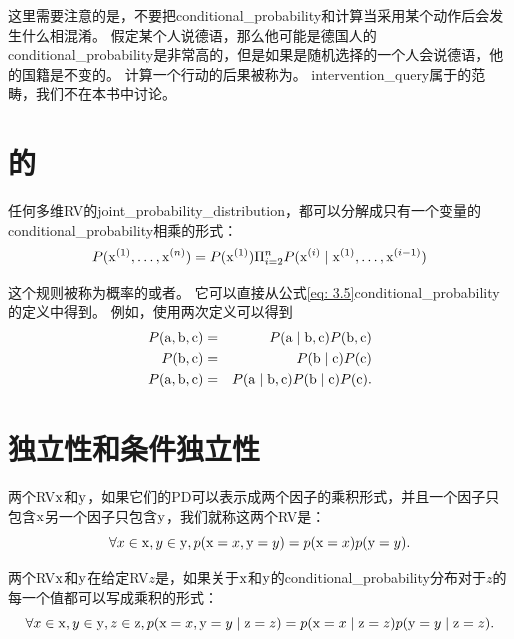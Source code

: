 这里需要注意的是，不要把\gls{conditional_probability}和计算当采用某个动作后会发生什么相混淆。
假定某个人说德语，那么他可能是德国人的\gls{conditional_probability}是非常高的，但是如果是随机选择的一个人会说德语，他的国籍是不变的。
计算一个行动的后果被称为。
\gls{intervention_query}属于的范畴，我们不在本书中讨论。

\section{的}
\label{sec:the_chain_rule_of_conditional_probabilities}

任何多维\gls{RV}的\gls{joint_probability_distribution}，都可以分解成只有一个变量的\gls{conditional_probability}相乘的形式：
\begin{equation}
P(\mathrm{x}^{(1)}, \ldots, \mathrm{x}^{(n)}) = P(\mathrm{x}^{(1)}) \Pi_{i=2}^n P(\mathrm{x}^{(i)} \mid \mathrm{x}^{(1)}, \ldots, \mathrm{x}^{(i-1)})
\label{eq:chap3_chain_rule}
\end{equation}


这个规则被称为概率的或者。
它可以直接从公式\ref{eq: 3.5}\gls{conditional_probability}的定义中得到。
例如，使用两次定义可以得到
\begin{eqnarray*}
P(\mathrm{a}, \mathrm{b}, \mathrm{c}) &=& P(\mathrm{a} \mid \mathrm{b}, \mathrm{c}) P(\mathrm{b}, \mathrm{c})\\
P(\mathrm{b}, \mathrm{c}) &=& P(\mathrm{b} \mid \mathrm{c}) P(\mathrm{c})\\
P(\mathrm{a}, \mathrm{b}, \mathrm{c}) &=& P(\mathrm{a} \mid \mathrm{b}, \mathrm{c}) P(\mathrm{b} \mid \mathrm{c}) P(\mathrm{c}).
\end{eqnarray*}

\section{独立性和条件独立性}
\label{sec:independence_and_conditional_independence}

两个\gls{RV}$\mathrm{x}$和$\mathrm{y}$，如果它们的\gls{PD}可以表示成两个因子的乘积形式，并且一个因子只包含$\mathrm{x}$另一个因子只包含$\mathrm{y}$，我们就称这两个\gls{RV}是：
\begin{equation}
\forall x \in \mathrm{x}, y \in \mathrm{y}, p(\mathrm{x} = x, \mathrm{y} = y) = p(\mathrm{x} = x)p(\mathrm{y} = y).
\end{equation}

两个\gls{RV}$\mathrm{x}$和$\mathrm{y}$在给定\gls{RV}$z$是，如果关于$\mathrm{x}$和$\mathrm{y}$的\gls{conditional_probability}分布对于$z$的每一个值都可以写成乘积的形式：
\begin{equation}
\forall x \in \mathrm{x}, y \in \mathrm{y}, z \in \mathrm{z}, p( \mathrm{x}=x, \mathrm{y}=y \mid \mathrm{z}=z) =
p(\mathrm{x} = x \mid \mathrm{z} = z) p(\mathrm{y} = y \mid \mathrm{z} = z).
\end{equation}


